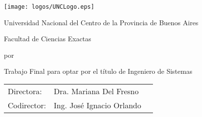 \begin{titlepage}

\begin{center}
	
\texttt{[image: logos/UNCLogo.eps]}
\bigskip
\vspace*{2\bigskipamount}

Universidad Nacional del Centro de la Provincia de Buenos Aires
\bigskip


Facultad de Ciencias Exactas
\bigskip
\vspace*{2\bigskipamount}



{\makeatletter
\titlestyle\color{tudelft-dark-blue}\Huge\@title
\makeatother}

\vspace*{2\bigskipamount}

\bigskip
\bigskip

por

\bigskip
\bigskip

{\makeatletter
	\titlefont\Large\bfseries\@author
	\makeatother}
\vfill
\bigskip

\vfill
\bigskip
\bigskip



Trabajo Final para optar por el título de Ingeniero de Sistemas

\bigskip
\bigskip

\begin{tabular}{lll}
	Directora: & Dra. Mariana Del Fresno \\
	Codirector: & Ing. José Ignacio Orlando \\
\end{tabular}


{\makeatletter
\ifx\@subtitle\undefined\else
    \bigskip
    \titlefont\titleshape\LARGE\@subtitle
\fi
\makeatother}






\bigskip
\bigskip
\bigskip
\bigskip




\bigskip
\bigskip

\bigskip
\bigskip

\end{center}

\end{titlepage}

